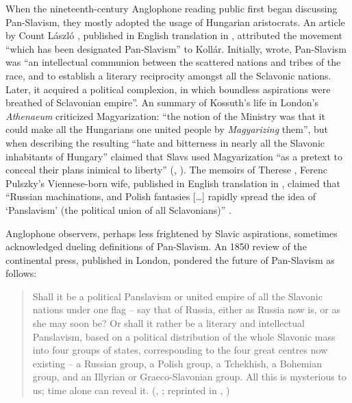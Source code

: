 When the nineteenth-century Anglophone reading public first began discus\-sing Pan-Slavism, they mostly adopted the usage of Hungarian aristocrats. An article by Count László \citeauthor{teleki_hungary_1849}, published in English translation in \citeyear{teleki_hungary_1849}, attributed the movement “which has been designated Pan-Slavism” to Kollár. Initially, \linebreak{}\citet[19]{teleki_hungary_1849} wrote, Pan-Slavism was “an intellectual communion between the scattered nations and tribes of the race, and to establish a literary reciprocity amongst all the Sclavonic nations. Later, it acquired a political complexion, in which boundless aspirations were breathed of Sclavonian empire”. An \citeyear{anon_reviews_1849} summary of Kossuth’s life in London’s \textit{Athenaeum} criticized Magyarization: “the notion of the Ministry was that it could make all the Hungarians one united people by \textit{Magyarizing} them”, but when describing the resulting “hate and bitterness in nearly all the Slavonic inhabitants of Hungary” claimed that Slavs used Magyarization “as a pretext to conceal their plans inimical to liberty” (, \cite[855]{anon_reviews_1849}). The memoirs of Therese \citeauthor{pulszky_memoirs_1850}, Ferenc Pulszky’s Viennese-born wife, published in English translation in \citeyear{pulszky_memoirs_1850}, claimed that “Russian machinations, and Polish fantasies […] rapidly spread the idea of ‘Panslavism’ (the political union of all Sclavonians)” \citep[149]{pulszky_memoirs_1850}.

Anglophone observers, perhaps less frightened by Slavic aspirations, sometimes acknowledged dueling definitions of Pan-Slavism. An 1850 review of the continental press, published in London, pondered the future of Pan-Slavism as follows:

\begin{quote}
    Shall it be a political Panslavism or united empire of all the Slavonic nations under one flag – say that of Russia, either as Russia now is, or as she may soon be? Or shall it rather be a literary and intellectual Panslavism, based on a political distribution of the whole Slavonic mass into four groups of states, corresponding to the four great centres now existing – a Russian group, a Polish group, a Tchekhish, a Bohemian group, and an Illyrian or Graeco-Slavonian group. All this is mysterious to us; time alone can reveal it. (, \cite[244]{anon_eastern_1850}; reprinted in , \cite[343]{anon_eastern_1850-1})
\end{quote}

